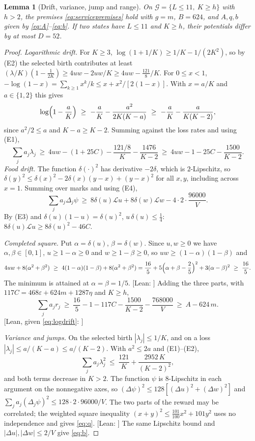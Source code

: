 \documentclass[11pt,letterpaper]{article}
\theoremstyle{plain}
\newtheorem{lemma}[theorem]{Lemma}
\theoremstyle{definition}
\theoremstyle{remark}
\numberwithin{equation}{section}
\newcommand{\cL}{\mathcal L}
\newcommand{\eps}{\varepsilon}
\newcommand{\evid}[1]{{\normalfont\small\textsf{[}#1\textsf{]}}}
\begin{document}
\begin{lemma}[Drift, variance, jump and range]\label{lem:reward}
On $\mathcal G=\{L\le11,\ K\ge h\}$ with $h>2$, the premises \eqref{eq:servicepremises} hold with $g=m$, $B=624$, and $A,q,b$ given by \eqref{eq:A}--\eqref{eq:b}. If two states have $L\le11$ and $K\ge h$, their potentials differ by at most $D=52$.
\end{lemma}
\begin{proof}
\emph{Logarithmic drift.} For $K\ge3$, $\log(1+1/K)\ge1/K-1/(2K^2)$, so by (E2) the selected birth contributes at least $(\lambda/K)(1-\tfrac1{2K})\ge4uw-2uw/K\ge4uw-\tfrac{121}8/K$. For $0\le x<1$, $-\log(1-x)=\sum_{k\ge1}x^k/k\le x+x^2/[2(1-x)]$. With $x=a/K$ and $a\in\{1,2\}$ this gives
\[
 \log\Bigl(1-\frac aK\Bigr)\ \ge\ -\frac aK-\frac{a^2}{2K(K-a)}\ \ge\ -\frac aK-\frac a{K(K-2)} ,
\]
since $a^2/2\le a$ and $K-a\ge K-2$. Summing against the loss rates and using (E1),
\begin{equation}\label{eq:logdrift}
 \sum_ja_j\lambda_j\ \ge\ 4uw-(1+25C)-\frac{121/8}{K}-\frac{1476}{K-2}\ \ge\ 4uw-1-25C-\frac{1500}{K-2} .
\end{equation}
\emph{Food drift.} The function $\delta(\cdot)^2$ has derivative $-2\delta$, which is $2$-Lipschitz, so $\delta(y)^2\le\delta(x)^2-2\delta(x)(y-x)+(y-x)^2$ for all $x,y$, including across $x=1$. Summing over marks and using (E4),
\[
 \sum_ja_j\Delta_j\psi\ \ge\ 8\delta(u)\cL u+8\delta(w)\cL w-4\cdot2\cdot\frac{96000}V .
\]
By (E3) and $\delta(u)(1-u)=\delta(u)^2$, $u\,\delta(u)\le\tfrac14$: $8\delta(u)\cL u\ge8\delta(u)^2-46C$.

\emph{Completed square.} Put $\alpha=\delta(u)$, $\beta=\delta(w)$. Since $u,w\ge0$ we have $\alpha,\beta\in[0,1]$, $u\ge1-\alpha\ge0$ and $w\ge1-\beta\ge0$, so $uw\ge(1-\alpha)(1-\beta)$ and
\begin{equation}\label{eq:square}
 4uw+8(\alpha^2+\beta^2)\ \ge\ 4(1-\alpha)(1-\beta)+8(\alpha^2+\beta^2)=\frac{16}5+5\Bigl(\alpha+\beta-\frac25\Bigr)^2+3(\alpha-\beta)^2\ \ge\ \frac{16}5 .
\end{equation}
The minimum is attained at $\alpha=\beta=1/5$. \evid{Lean: } Adding the three parts, with $117C=468\eps+624m+1287\eta$ and $K\ge h$,
\[
 \sum_ja_jr_j\ \ge\ \frac{16}5-1-117C-\frac{1500}{K-2}-\frac{768000}V\ \ge\ A-624\,m .
\]
\evid{Lean, given \eqref{eq:logdrift}: \lean{StartupCount.count_log_occupation_sharp}}

\emph{Variance and jumps.} On the selected birth $|\lambda_j|\le1/K$, and on a loss $|\lambda_j|\le a/(K-a)\le a/(K-2)$. With $a^2\le2a$ and (E1)--(E2),
\[
 \sum_ja_j\lambda_j^2\ \le\ \frac{121}K+\frac{2952\,K}{(K-2)^2},
\]
and both terms decrease in $K>2$. The function $\psi$ is $8$-Lipschitz in each argument on the nonnegative axes, so $(\Delta\psi)^2\le128[(\Delta u)^2+(\Delta w)^2]$ and $\sum_ja_j(\Delta_j\psi)^2\le128\cdot2\cdot96000/V$. The two parts of the reward may be correlated; the weighted square inequality $(x+y)^2\le\frac{101}{100}x^2+101y^2$ uses no independence and gives \eqref{eq:q}. \evid{Lean: } The same Lipschitz bound and $|\Delta u|,|\Delta w|\le2/V$ give \eqref{eq:b}.


\end{proof}
\end{document}
